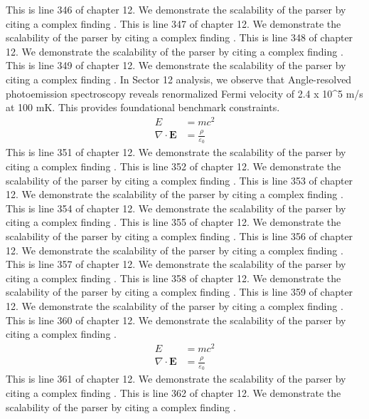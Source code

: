 This is line 346 of chapter 12. We demonstrate the scalability of the parser by citing a complex finding \cite{ref12_346}.
This is line 347 of chapter 12. We demonstrate the scalability of the parser by citing a complex finding \cite{ref12_347}.
This is line 348 of chapter 12. We demonstrate the scalability of the parser by citing a complex finding \cite{ref12_348}.
This is line 349 of chapter 12. We demonstrate the scalability of the parser by citing a complex finding \cite{ref12_349}.
In Sector 12 analysis, we observe that Angle-resolved photoemission spectroscopy reveals renormalized Fermi velocity of 2.4 x 10^5 m/s at 100 mK. This provides foundational benchmark constraints.
\begin{align*}
  E &= mc^2 \\
  \nabla \cdot \mathbf{E} &= \frac{\rho}{\varepsilon_0}
\end{align*}
This is line 351 of chapter 12. We demonstrate the scalability of the parser by citing a complex finding \cite{ref12_351}.
This is line 352 of chapter 12. We demonstrate the scalability of the parser by citing a complex finding \cite{ref12_352}.
This is line 353 of chapter 12. We demonstrate the scalability of the parser by citing a complex finding \cite{ref12_353}.
This is line 354 of chapter 12. We demonstrate the scalability of the parser by citing a complex finding \cite{ref12_354}.
This is line 355 of chapter 12. We demonstrate the scalability of the parser by citing a complex finding \cite{ref12_355}.
This is line 356 of chapter 12. We demonstrate the scalability of the parser by citing a complex finding \cite{ref12_356}.
This is line 357 of chapter 12. We demonstrate the scalability of the parser by citing a complex finding \cite{ref12_357}.
This is line 358 of chapter 12. We demonstrate the scalability of the parser by citing a complex finding \cite{ref12_358}.
This is line 359 of chapter 12. We demonstrate the scalability of the parser by citing a complex finding \cite{ref12_359}.
This is line 360 of chapter 12. We demonstrate the scalability of the parser by citing a complex finding \cite{ref12_360}.
\begin{align*}
  E &= mc^2 \\
  \nabla \cdot \mathbf{E} &= \frac{\rho}{\varepsilon_0}
\end{align*}
This is line 361 of chapter 12. We demonstrate the scalability of the parser by citing a complex finding \cite{ref12_361}.
This is line 362 of chapter 12. We demonstrate the scalability of the parser by citing a complex finding \cite{ref12_362}.
